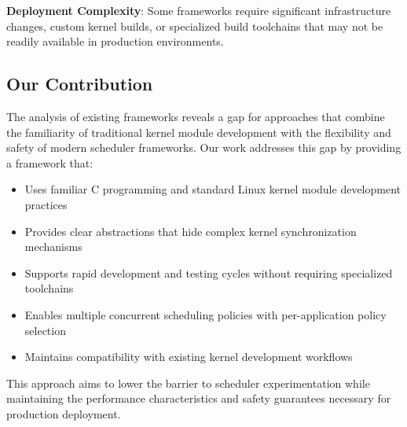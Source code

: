 \parspace
\textbf{Deployment Complexity}: Some frameworks require significant infrastructure changes, custom kernel builds, or specialized build toolchains that may not be readily available in production environments.

\subsection{Our Contribution}

The analysis of existing frameworks reveals a gap for approaches that combine the familiarity of traditional kernel module development with the flexibility and safety of modern scheduler frameworks. Our work addresses this gap by providing a framework that:

\begin{itemize}
\item Uses familiar C programming and standard Linux kernel module development practices
\item Provides clear abstractions that hide complex kernel synchronization mechanisms
\item Supports rapid development and testing cycles without requiring specialized toolchains
\item Enables multiple concurrent scheduling policies with per-application policy selection
\item Maintains compatibility with existing kernel development workflows
\end{itemize}

This approach aims to lower the barrier to scheduler experimentation while maintaining the performance characteristics and safety guarantees necessary for production deployment.